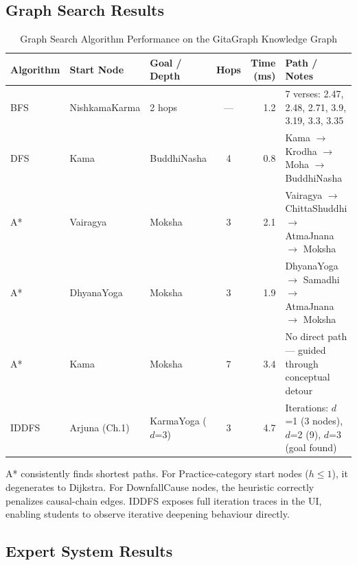 \documentclass[conference]{IEEEtran}
\begin{document}
\subsection{Graph Search Results}

\begin{table}[!t]
\caption{Graph Search Algorithm Performance on the GitaGraph Knowledge Graph}
\label{tab:search}
\centering
\begin{tabular}{@{}l l l c r l@{}}
\toprule
\textbf{Algorithm} & \textbf{Start Node} & \textbf{Goal / Depth} & \textbf{Hops} & \textbf{Time (ms)} & \textbf{Path / Notes} \\
\midrule
BFS   & NishkamaKarma  & 2 hops              & ---  & 1.2  & 7 verses: 2.47, 2.48, 2.71, 3.9, 3.19, 3.3, 3.35 \\
DFS   & Kama           & BuddhiNasha         & 4    & 0.8  & Kama $\to$ Krodha $\to$ Moha $\to$ BuddhiNasha \\
A*    & Vairagya       & Moksha              & 3    & 2.1  & Vairagya $\to$ ChittaShuddhi $\to$ AtmaJnana $\to$ Moksha \\
A*    & DhyanaYoga     & Moksha              & 3    & 1.9  & DhyanaYoga $\to$ Samadhi $\to$ AtmaJnana $\to$ Moksha \\
A*    & Kama           & Moksha              & 7    & 3.4  & No direct path — guided through conceptual detour \\
IDDFS & Arjuna (Ch.1)  & KarmaYoga ($d$=3)   & 3    & 4.7  & Iterations: $d$=1 (3 nodes), $d$=2 (9), $d$=3 (goal found) \\
\bottomrule
\end{tabular}
\end{table}

A* consistently finds shortest paths. For Practice-category start nodes
($h \leq 1$), it degenerates to Dijkstra. For DownfallCause nodes, the
heuristic correctly penalizes causal-chain edges. IDDFS exposes full
iteration traces in the UI, enabling students to observe iterative
deepening behaviour directly.

\subsection{Expert System Results}
\end{document}
